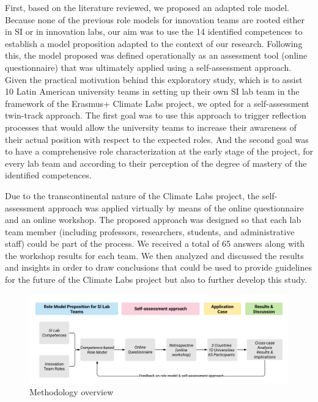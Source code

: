 \documentclass[AMA,STIX1COL,APA,STIX2COL]{WileyNJD-v2}
\begin{document}
First, based on the literature reviewed, we proposed an adapted role
model. Because none of the previous role models for innovation teams are
rooted either in SI or in innovation labs, our aim was to use the 14
identified competences to establish a model proposition adapted to the
context of our research. Following this, the model proposed was defined
operationally as an assessment tool (online questionnaire) that was
ultimately applied using a self-assessment approach. Given the practical
motivation behind this exploratory study, which is to assist 10 Latin
American university teams in setting up their own SI lab team in the
framework of the Erasmus+ Climate Labs project, we opted for a
self-assessment twin-track approach. The first goal was to use this
approach to trigger reflection processes that would allow the university
teams to increase their awareness of their actual position with respect
to the expected roles. And the second goal was to have a comprehensive
role characterization at the early stage of the project, for every lab
team and according to their perception of the degree of mastery of the
identified competences.

Due to the transcontinental nature of the Climate Labs project, the
self-assessment approach was applied virtually by means of the online
questionnaire and an online workshop. The proposed approach was designed
so that each lab team member (including professors, researchers,
students, and administrative staff) could be part of the process. We
received a total of 65 answers along with the workshop results for each
team. We then analyzed and discussed the results and insights in order
to draw conclusions that could be used to provide guidelines for the
future of the Climate Labs project but also to further develop this
study.

\begin{figure}[b]

{\centering \includegraphics[width=0.95\linewidth]{Figures/Figure 1 - Methodology} 

}

\caption{Methodology overview}\label{fig:fig1}
\end{figure}
\end{document}
